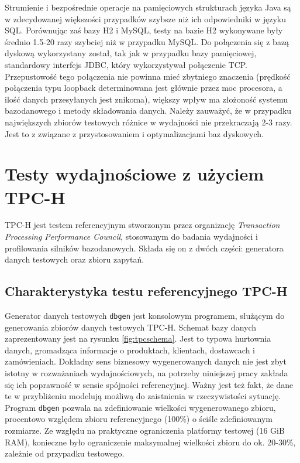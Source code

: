 \documentclass[12pt,twoside,openright]{extarticle}
\begin{document}
    Strumienie i bezpośrednie operacje na pamięciowych strukturach języka Java są w zdecydowanej większości przypadków szybsze niż ich odpowiedniki w języku SQL. Porównując zaś bazy H2 i MySQL, testy na bazie H2 wykonywane były średnio 1.5-20 razy szybciej niż w przypadku MySQL.  Do połączenia się z bazą dyskową wykorzystany został, tak jak w przypadku bazy pamięciowej, standardowy interfejs JDBC, który wykorzystywał połączenie TCP. Przepustowość tego połączenia nie powinna mieć zbytniego znaczenia (prędkość połączenia typu loopback determinowana jest głównie przez moc procesora, a ilość danych przesyłanych jest znikoma), większy wpływ ma złożoność systemu bazodanowego i metody składowania danych. Należy zauważyć, że w przypadku największych zbiorów testowych różnice w wydajności nie przekraczają 2-3 razy. Jest to z związane z przystosowaniem i optymalizacjami baz dyskowych.


\cleardoublepage
\section{Testy wydajnościowe z użyciem TPC-H} \label{tpc}

    TPC-H jest testem referencyjnym stworzonym przez organizację \textit{Transaction Processing Performance Council}, stosowanym do badania wydajności i profilowania silników bazodanowych. Składa się on z dwóch części: generatora danych testowych oraz zbioru zapytań.

\subsection{Charakterystyka testu referencyjnego TPC-H}

    Generator danych testowych \texttt{dbgen} jest konsolowym programem, służącym do generowania zbiorów danych testowych TPC-H. Schemat bazy danych zaprezentowany jest na rysunku \ref{fig:tpcschema}. Jest to typowa hurtownia danych, gromadząca informacje o produktach, klientach, dostawcach i zamówieniach. Dokładny sens biznesowy wygenerowanych danych nie jest zbyt istotny w rozważaniach wydajnościowych, na potrzeby niniejszej pracy zakłada się ich poprawność w sensie spójności referencyjnej. Ważny jest też fakt, że dane te w przybliżeniu modelują możliwą do zaistnienia w rzeczywistości sytuację. Program \texttt{dbgen} pozwala na zdefiniowanie wielkości wygenerowanego zbioru, procentowo względem zbioru referencyjnego (100\%) o ściśle zdefiniowanym rozmiarze. Ze względu na praktyczne ograniczenia platformy testowej (16 GiB RAM), konieczne było ograniczenie maksymalnej wielkości zbioru do ok. 20-30\%, zależnie od przypadku testowego. 
\end{document}
